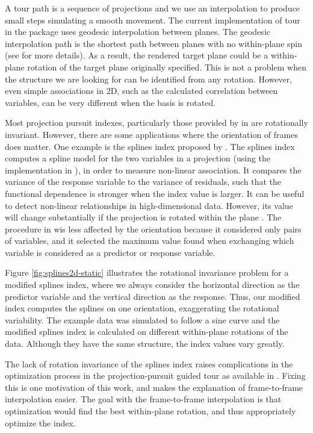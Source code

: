 A tour path is a sequence of projections and we use an interpolation to produce small steps simulating a smooth movement. The current implementation of tour in the  package uses geodesic interpolation between planes. The geodesic interpolation path is the shortest path between planes with no within-plane spin (see \citet{Buja2004TheoryOD} for more details). As a result, the rendered target plane could be a within-plane rotation of the target plane originally specified. This is not a problem when the structure we are looking for can be identified from any rotation. However, even simple associations in 2D, such as the calculated correlation between variables, can be very different when the basis is rotated.

Most projection pursuit indexes, particularly those provided by in  are rotationally invariant. However, there are some applications where the orientation of frames does matter. One example is the splines index proposed by \citet{Grimm2016}. The splines index computes a spline model for the two variables in a projection (using the implementation in  \citep{mgcv-gam}), in order to measure non-linear association. It compares the variance of the response variable to the variance of residuals, such that the functional dependence is stronger when the index value is larger. It can be useful to detect non-linear relationships in high-dimensional data. However, its value will change substantially if the projection is rotated within the plane \citep{pp}. The procedure in \citet{Grimm2016} wis less affected by the orientation because it considered only pairs of variables, and it selected the maximum value found when exchanging which variable is considered as a predictor or response variable.

Figure \ref{fig:splines2d-static} illustrates the rotational invariance problem for a modified splines index, where we always consider the horizontal direction as the predictor variable and the vertical direction as the response. Thus, our modified index computes the splines on one orientation, exaggerating the rotational variability. The example data was simulated to follow a sine curve and the modified splines index is calculated on different within-plane rotations of the data. Although they have the same structure, the index values vary greatly.

The lack of rotation invariance of the splines index raises complications in the optimization process in the projection-pursuit guided tour as available in . Fixing this is one motivation of this work, and makes the explanation of frame-to-frame interpolation easier. The goal with the frame-to-frame interpolation is that optimization would find the best within-plane rotation, and thus appropriately optimize the index.


